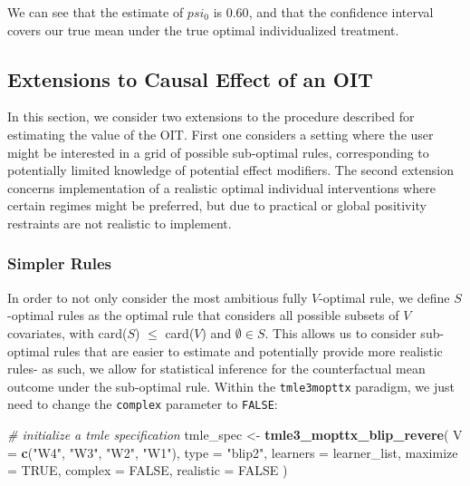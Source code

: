 \documentclass[12pt, krantz2,]{krantz}
\newenvironment{Shaded}{\begin{snugshade}}{\end{snugshade}}
\newcommand{\CommentTok}[1]{\textcolor[rgb]{0.37,0.37,0.37}{\textit{#1}}}
\newcommand{\DataTypeTok}[1]{\textcolor[rgb]{0.27,0.27,0.27}{#1}}
\newcommand{\KeywordTok}[1]{\textcolor[rgb]{0.27,0.27,0.27}{\textbf{#1}}}
\newcommand{\NormalTok}[1]{#1}
\newcommand{\OtherTok}[1]{\textcolor[rgb]{0.37,0.37,0.37}{#1}}
\newcommand{\StringTok}[1]{\textcolor[rgb]{0.5,0.5,0.5}{#1}}
\theoremstyle{definition}
\theoremstyle{definition}
\theoremstyle{definition}
\newcommand{\1}{\mathbbm{1}}
\begin{document}
We can see that the estimate of \(psi_0\) is \(0.60\), and that the confidence
interval covers our true mean under the true optimal individualized treatment.

\hypertarget{extensions-to-causal-effect-of-an-oit}{%
\subsection{Extensions to Causal Effect of an OIT}\label{extensions-to-causal-effect-of-an-oit}}

In this section, we consider two extensions to the procedure described for
estimating the value of the OIT. First one considers a setting where the user
might be interested in a grid of possible sub-optimal rules, corresponding to
potentially limited knowledge of potential effect modifiers. The second
extension concerns implementation of a realistic optimal individual
interventions where certain regimes might be preferred, but due to practical or
global positivity restraints are not realistic to implement.

\hypertarget{simpler-rules}{%
\subsubsection{Simpler Rules}\label{simpler-rules}}

In order to not only consider the most ambitious fully \(V\)-optimal rule, we
define \(S\)-optimal rules as the optimal rule that considers all possible subsets
of \(V\) covariates, with card(\(S\)) \(\leq\) card(\(V\)) and \(\emptyset \in S\). This
allows us to consider sub-optimal rules that are easier to estimate and
potentially provide more realistic rules- as such, we allow for statistical
inference for the counterfactual mean outcome under the sub-optimal rule.
Within the \texttt{tmle3mopttx} paradigm, we just need to change the \texttt{complex}
parameter to \texttt{FALSE}:

\begin{Shaded}
\begin{Highlighting}[]
\CommentTok{# initialize a tmle specification}
\NormalTok{tmle_spec <-}\StringTok{ }\KeywordTok{tmle3_mopttx_blip_revere}\NormalTok{(}
  \DataTypeTok{V =} \KeywordTok{c}\NormalTok{(}\StringTok{"W4"}\NormalTok{, }\StringTok{"W3"}\NormalTok{, }\StringTok{"W2"}\NormalTok{, }\StringTok{"W1"}\NormalTok{), }\DataTypeTok{type =} \StringTok{"blip2"}\NormalTok{,}
  \DataTypeTok{learners =}\NormalTok{ learner_list,}
  \DataTypeTok{maximize =} \OtherTok{TRUE}\NormalTok{, }\DataTypeTok{complex =} \OtherTok{FALSE}\NormalTok{, }\DataTypeTok{realistic =} \OtherTok{FALSE}
\NormalTok{)}
\end{Highlighting}
\end{Shaded}
\end{document}
